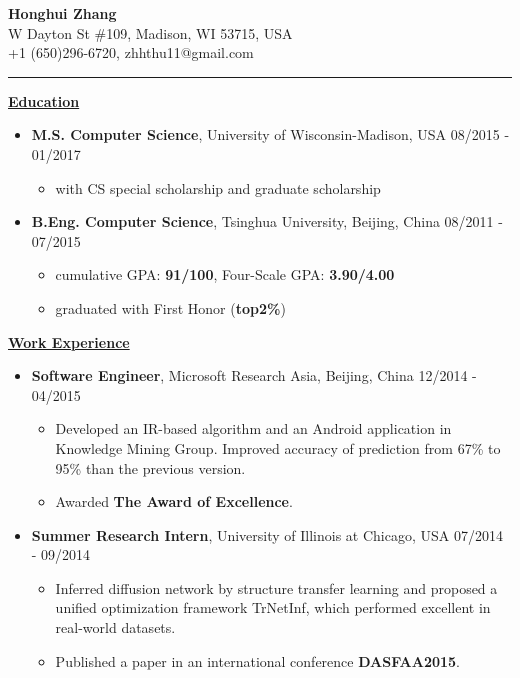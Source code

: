\documentclass[11pt]{article}
\begin{document}
\begin{CJK}{GBK}{kai}
\begin{center}
  {\textbf{\huge Honghui Zhang}}\\ W Dayton St \#109, Madison, WI 53715, USA\\
  +1 (650)296-6720, zhhthu11@gmail.com\\
\end{center}
\rule[4pt]{16.5cm}{0.5pt}
{ \textbf{\underline{Education}}}\\\medskip
\begin{itemize}
  \item \textbf{M.S. Computer Science}, University of Wisconsin-Madison, USA \hfill 08/2015 - 01/2017\\
    \begin{itemize}
    \item with CS special scholarship and graduate scholarship\\\medskip
    \end{itemize}
 \item \textbf{B.Eng. Computer Science}, Tsinghua University, Beijing, China \hfill 08/2011 - 07/2015\\
    \begin{itemize}
    \item cumulative GPA: \textbf{91/100}, Four-Scale GPA: \textbf{3.90/4.00}
    \item graduated with First Honor (\textbf{top2\%})
    \end{itemize}
\end{itemize}

\bigskip

{ \textbf{\underline{Work Experience}}}\\\medskip

\begin{itemize}
   \item \textbf{Software Engineer}, Microsoft Research Asia, Beijing, China \hfill 12/2014 - 04/2015\\
     \begin{itemize}
     \item Developed an IR-based algorithm and an Android application in Knowledge Mining Group. Improved accuracy of prediction from 67\% to 95\% than the previous version.
     \item Awarded \textbf{The Award of Excellence}.\\\medskip
     \end{itemize}

   \item \textbf{Summer Research Intern}, University of Illinois at Chicago, USA \hfill 07/2014 - 09/2014\\
     \begin{itemize}
     \item Inferred diffusion network  by structure transfer learning and proposed a unified optimization framework TrNetInf, which performed excellent in real-world datasets.
     \item Published a paper in an international conference \textbf{DASFAA2015}. \\\medskip
     \end{itemize}
  

\end{itemize}
\end{CJK}
\end{document}
